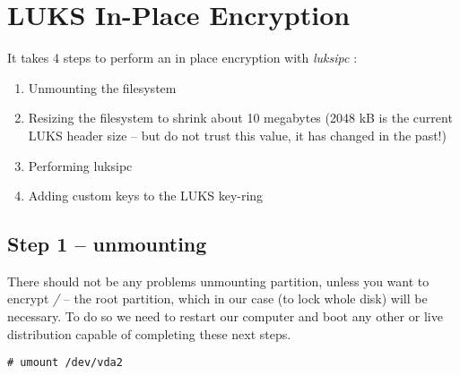\chapter{LUKS In-Place Encryption}
\label{luksipc}
It takes 4 steps to perform an in place encryption with {\it luksipc} \cite{luksipc}:
\begin{enumerate}
    \item Unmounting the filesystem
    \item Resizing the filesystem to shrink about 10 megabytes (2048 kB is the current LUKS header size -- but do not trust this value, it has changed in the past!)
    \item Performing luksipc
    \item Adding custom keys to the LUKS key-ring
\end{enumerate}



\section{Step 1 -- unmounting}
There should not be any problems unmounting partition, unless you want to encrypt {\it /} -- the root partition, which in our case (to lock whole disk) will be necessary.
To do so we need to restart our computer and boot any other or live distribution capable of completing these next steps.
\begin{lstlisting}[columns=fixed,basicstyle=\ttfamily\footnotesize,tabsize=4,backgroundcolor=\color{yellow!10}]
# umount /dev/vda2
\end{lstlisting}




